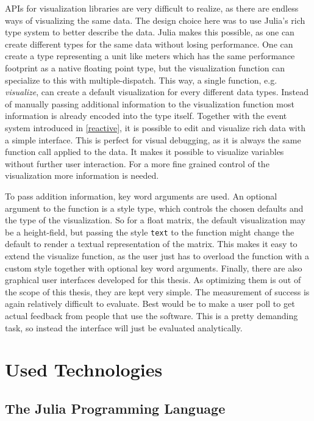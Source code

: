 \ac{API}s for visualization libraries are very difficult to realize, as there are endless ways of visualizing the same data.
The design choice here was to use Julia's rich type system to better describe the data. 
Julia makes this possible, as one can create different types for the same data without losing performance.
One can create a type representing a unit like meters which has the same performance footprint as a native floating point type, but the visualization function can specialize to this with multiple-dispatch.
This way, a single function, e.g. \textit{visualize}, can create a default visualization for every different data types. 
Instead of manually passing additional information to the visualization function most information is already encoded into the type itself.
Together with the event system introduced in \ref{reactive}, it is possible to edit and visualize rich data with a simple interface. 
This is perfect for visual debugging, as it is always the same function call applied to the data. 
It makes it possible to visualize variables without further user interaction.
For a more fine grained control of the visualization more information is needed.

To pass addition information, key word arguments are used. An optional argument to the function is a style type, which controls the chosen defaults and the type of the visualization.
So for a float matrix, the default visualization may be a height-field, but passing the style \texttt{text} to the function might change the default to render a textual representation of the matrix.
This makes it easy to extend the visualize function, as the user just has to overload the function with a custom style together with optional key word arguments.
Finally, there are also graphical user interfaces developed for this thesis. As optimizing them is out of the scope of this thesis, they are kept very simple.
The measurement of success is again relatively difficult to evaluate.
Best would be to make a user poll to get actual feedback from people that use the software. This is a pretty demanding task, so instead the interface will just be evaluated analytically.


\section{Used Technologies}

\subsection{The Julia Programming Language}


